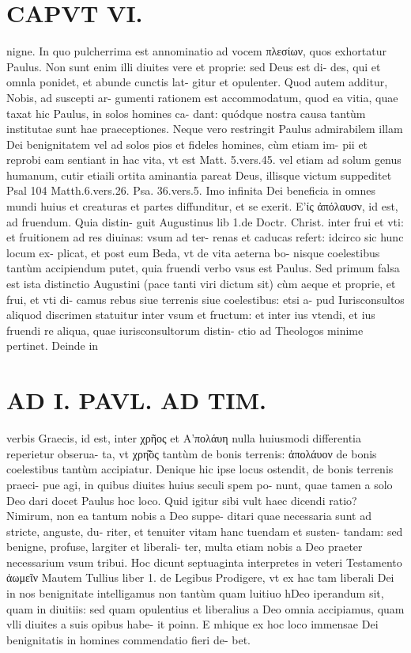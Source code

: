 \documentclass{article}
\begin{document}
\begin{pages}
\section*{CAPVT VI. }
\marginpar{[ p.499 ]}\pstart nigne. In quo pulcherrima est annominatio ad vocem πλεσίων, quos exhortatur Paulus. Non sunt enim illi diuites vere et proprie: sed Deus est di- des, qui et omnla ponidet, et abunde cunctis lat- gitur et opulenter.  \pend\pstart Quod autem additur, Nobis, ad suscepti ar- gumenti rationem est accommodatum, quod ea vitia, quae taxat hic Paulus, in solos homines ca- dant: quódque nostra causa tantùm institutae sunt hae praeceptiones. Neque vero restringit Paulus admirabilem illam Dei benignitatem vel ad solos pios et fideles homines, cùm etiam im- pii et reprobi eam sentiant in hac vita, vt est Matt. 5.vers.45. vel etiam ad solum genus humanum, cutir etiaili ortita aminantia pareat Deus, illisque victum suppeditet Psal 104 Matth.6.vers.26. Psa. 36.vers.5. Imo infinita Dei beneficia in omnes mundi huius et creaturas et partes diffunditur, et se exerit.  \pend\pstart Ε’ίς ἀπόλαυσν, id est, ad fruendum. Quia distin- guit Augustinus lib 1.de Doctr. Christ. inter frui et vti: et fruitionem ad res diuinas: vsum ad ter- renas et caducas refert: idcirco sic hunc locum ex- plicat, et post eum Beda, vt de vita aeterna bo- nisque coelestibus tantùm accipiendum putet, quia fruendi verbo vsus est Paulus. Sed primum falsa est ista distinctio Augustini (pace tanti viri dictum sit) cùm aeque et proprie, et frui, et vti di- camus rebus siue terrenis siue coelestibus: etsi a- pud Iurisconsultos aliquod discrimen statuitur inter vsum et fructum: et inter ius vtendi, et ius fruendi re aliqua, quae iurisconsultorum distin- ctio ad Theologos minime pertinet. Deinde in  \pend
\section*{AD I. PAVL. AD TIM. }
\marginpar{[ p.309. ]}\pstart verbis Graecis, id est, inter χρῆος et Α'πολάυη nulla huiusmodi differentia reperietur obserua- ta, vt χρη̃͂ος tantùm de bonis terrenis: ἀπολάυον de bonis coelestibus tantùm accipiatur. Denique hic ipse locus ostendit, de bonis terrenis praeci- pue agi, in quibus diuites huius seculi spem po- nunt, quae tamen a solo Deo dari docet Paulus hoc loco. Quid igitur sibi vult haec dicendi ratio? Nimirum, non ea tantum nobis a Deo suppe- ditari quae necessaria sunt ad stricte, anguste, du- riter, et tenuiter vitam hanc tuendam et susten- tandam: sed benigne, profuse, largiter et liberali- ter, multa etiam nobis a Deo praeter necessarium vsum tribui. Hoc dicunt septuaginta interpretes in veteri Testamento ἀωμεῖν Mautem Tullius liber  1. de Legibus  Prodigere, vt ex hac tam liberali Dei in nos benignitate intelligamus non tantùm quam luitiuo hDeo iperandum sit, quam in diuitiis: sed quam opulentius et liberalius a Deo omnia accipiamus, quam vlli diuites a suis opibus habe- it poinn. E mhique ex hoc loco immensae Dei benignitatis in homines commendatio fieri de- bet.  \pend
{}
{}

\end{pages}
\end{document}
